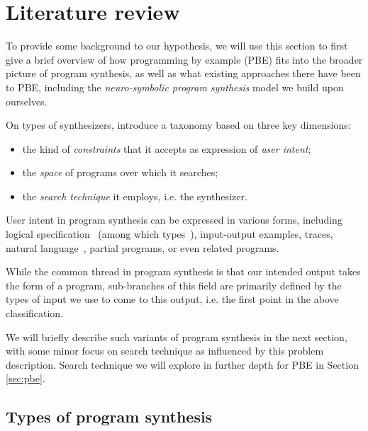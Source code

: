 \documentclass{article}
\begin{document}

\section{Literature review} \label{sec:litreview}

To provide some background to our hypothesis,
we will use this section to first give a brief overview of how programming by example (PBE) fits into the broader picture of program synthesis,
as well as what existing approaches there have been to PBE,
including the \emph{neuro-symbolic program synthesis} model we build upon ourselves.

On types of synthesizers,
\citet{gulwani2017program} introduce a taxonomy based on three key dimensions:
\begin{itemize}
    \item the kind of \emph{constraints} that it accepts as expression of \emph{user intent};
    \item the \emph{space} of programs over which it searches;
    \item the \emph{search technique} it employs, i.e. the synthesizer.
\end{itemize}

User intent in program synthesis can be expressed in various forms, including logical specification~\citep{temporalstreamlogic} (among which types~\citep{synquid}),
input-output examples, traces, natural language~\citep{abstractsyntaxnetworks},
partial programs, or even related programs.~\citep{gulwani2017program}

While the common thread in program synthesis is that our intended output takes the form of a program,
sub-branches of this field are primarily defined by the types of input we use to come to this output,
i.e. the 
first point
in the above classification.

We will briefly describe such variants of program synthesis in the next section,
with some minor focus on search technique as influenced by this problem description.
Search technique we will explore in further depth for PBE in Section \ref{sec:pbe}.

\subsection{Types of program synthesis} \label{sec:synthtypes}

\end{document}
